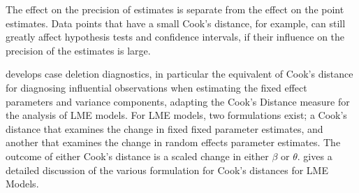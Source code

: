 \documentclass[12pt, a4paper]{report}
\theoremstyle{definition}
\theoremstyle{remark}
\begin{document}
The effect on the precision of estimates is separate from the effect on the point estimates. Data points that have a small Cook's distance, for example, can still greatly affect hypothesis tests and confidence intervals, if their  influence on the precision of the estimates is large.

\citet{Christensen} develops  case deletion diagnostics, in particular the equivalent of  Cook's distance for diagnosing influential observations when estimating the fixed effect parameters and variance components, adapting the Cook's Distance measure for the analysis of LME models. For LME models, two formulations exist; a Cook's distance that examines the change in fixed fixed parameter estimates, and another that examines the change in random effects parameter estimates. The outcome of either Cook's distance is a scaled change in either $\beta$ or $\theta$. \citet{Zewotir} gives a detailed discussion of the various formulation for Cook's distances for LME Models.


%	



%	
\end{document}

